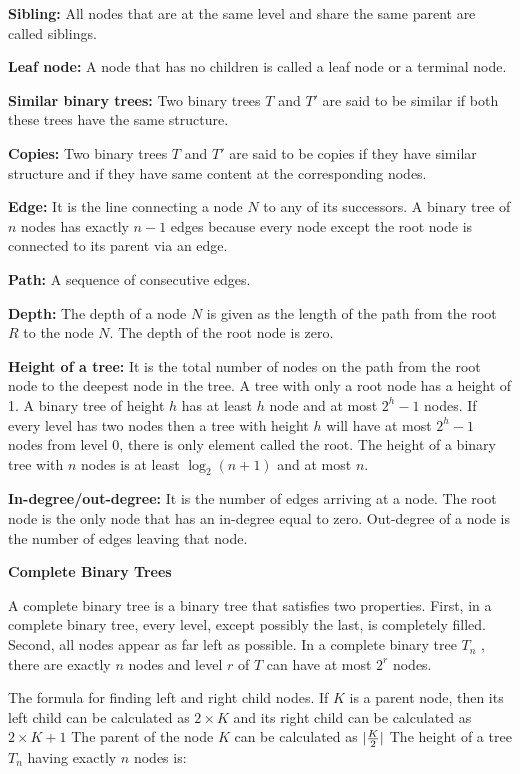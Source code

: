 \vskip 3mm
{\bf Sibling:} All nodes that are at the same level and share the same parent are called siblings.

\vskip 3mm
{\bf Leaf node:} A node that has no children is called a leaf node or a terminal node.

\vskip 3mm
{\bf Similar binary trees:} Two binary trees $T$ and $T'$ are said to be similar if both these trees have the same structure.

\vskip 3mm
{\bf Copies:} Two binary trees $T$ and $T'$ are said to be copies if they have similar structure and if they have same content at the corresponding nodes.

\vskip 3mm
{\bf Edge:} It is the line connecting a node $N$ to any of its successors. A binary tree of $n$ nodes has exactly $n-1$ edges because every node except the root node is connected to its parent via an edge.

\vskip 3mm
{\bf Path:} A sequence of consecutive edges.

\vskip 3mm
{\bf Depth:} The depth of a node $N$ is given as the length of the path from the root $R$ to the node $N$. The depth of the root node is zero.

\vskip 3mm
{\bf Height of a tree:} It is the total number of nodes on the path from the root node to the deepest node in the tree. A tree with only a root node has a height of 1. A binary tree of height $h$ has at least $h$ node and at most $2^h-1$ nodes. If every level has two nodes then a tree with height $h$ will have at most $2^h-1$ nodes from level 0, there is only element called the root. The height of a binary tree with $n$ nodes is at least $\log_2(n+1)$ and at most $n$.

\vskip 3mm
{\bf In-degree/out-degree:} It is the number of edges arriving at a node.  The root node is the only node that has an in-degree equal to zero. Out-degree of a node is the number of edges leaving that node.

\vskip 3mm
{\bf Complete Binary Trees}

\vskip 1mm
A complete binary tree is a binary tree that satisfies two properties. First, in a complete binary tree, every level, except possibly the last, is completely filled. Second, all nodes appear as far left as possible. In a complete binary tree $T_n$ , there are exactly $n$ nodes and level $r$ of $T$ can have at most $2^r$ nodes.

\vskip 1mm
The formula for finding left and right child nodes. If $K$ is a parent node, then its left child can be calculated as $2\times K$ and its right  child can be calculated as $2\times K+1$ The parent of the node $K$ can be calculated as $|{K\over 2}|$ The height of a tree $T_n$ having exactly $n$ nodes is:

